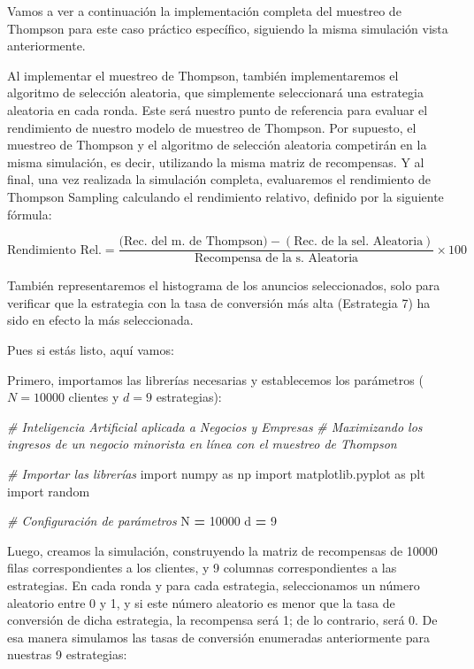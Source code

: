 \documentclass[
]{book}
\newenvironment{Shaded}{\begin{snugshade}}{\end{snugshade}}
\newcommand{\CommentTok}[1]{\textcolor[rgb]{0.56,0.35,0.01}{\textit{#1}}}
\newcommand{\DecValTok}[1]{\textcolor[rgb]{0.00,0.00,0.81}{#1}}
\newcommand{\ImportTok}[1]{#1}
\newcommand{\NormalTok}[1]{#1}
\newcommand{\OperatorTok}[1]{\textcolor[rgb]{0.81,0.36,0.00}{\textbf{#1}}}
\begin{document}
Vamos a ver a continuación la implementación completa del muestreo de Thompson para este caso práctico específico, siguiendo la misma simulación vista anteriormente.

Al implementar el muestreo de Thompson, también implementaremos el algoritmo de selección aleatoria, que simplemente seleccionará una estrategia aleatoria en cada ronda. Este será nuestro punto de referencia para evaluar el rendimiento de nuestro modelo de muestreo de Thompson. Por supuesto, el muestreo de Thompson y el algoritmo de selección aleatoria competirán en la misma simulación, es decir, utilizando la misma matriz de recompensas. Y al final, una vez realizada la simulación completa, evaluaremos el rendimiento de Thompson Sampling calculando el rendimiento relativo, definido por la siguiente fórmula:

\[\textrm{Rendimiento Rel.} = \frac{\textrm{(Rec. del m. de Thompson)} - (\textrm{Rec. de la sel. Aleatoria})}{\textrm{Recompensa de la s. Aleatoria}} \times 100\]

También representaremos el histograma de los anuncios seleccionados, solo para verificar que la estrategia con la tasa de conversión más alta (Estrategia 7) ha sido en efecto la más seleccionada.

Pues si estás listo, aquí vamos:

Primero, importamos las librerías necesarias y establecemos los parámetros (\(N = 10000\) clientes y \(d = 9\) estrategias):

\begin{Shaded}
\begin{Highlighting}[]
\CommentTok{\# Inteligencia Artificial aplicada a Negocios y Empresas}
\CommentTok{\# Maximizando los ingresos de un negocio minorista en línea con el muestreo de Thompson}

\CommentTok{\# Importar las librerías}
\ImportTok{import}\NormalTok{ numpy }\ImportTok{as}\NormalTok{ np}
\ImportTok{import}\NormalTok{ matplotlib.pyplot }\ImportTok{as}\NormalTok{ plt}
\ImportTok{import}\NormalTok{ random}

\CommentTok{\# Configuración de parámetros}
\NormalTok{N }\OperatorTok{=} \DecValTok{10000}
\NormalTok{d }\OperatorTok{=} \DecValTok{9}
\end{Highlighting}
\end{Shaded}

Luego, creamos la simulación, construyendo la matriz de recompensas de 10000 filas correspondientes a los clientes, y 9 columnas correspondientes a las estrategias. En cada ronda y para cada estrategia, seleccionamos un número aleatorio entre 0 y 1, y si este número aleatorio es menor que la tasa de conversión de dicha estrategia, la recompensa será 1; de lo contrario, será 0. De esa manera simulamos las tasas de conversión enumeradas anteriormente para nuestras 9 estrategias:
\end{document}
